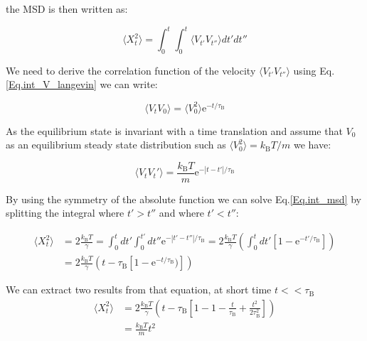 
the \gls{MSD} is then written as:

\begin{equation}
	\langle X_t ^ 2 \rangle  = \int _0 ^ {t} \int _0 ^{t} \langle V_{t'}V_{t''} \rangle dt'dt''
	\label{Eq.int_msd}
\end{equation}

We need to derive the correlation function of the velocity $ \langle V_{t'}V_{t''} \rangle $ using Eq.\ref{Eq.int_V_langevin} we can write:

\begin{equation}
	\langle V_t V_0 \rangle = \langle V_0 ^2 \rangle \mathrm{e}^{-t/\tau_{\mathrm{B}}}
\end{equation}

As the equilibrium state is invariant with a time translation and assume that $V_0$ as an equilibrium steady state distribution such as $\langle V_0^2 \rangle = k_\mathrm{B} T / m$ we have:

\begin{equation}
	\langle V_t V_t' \rangle = \frac{k_\mathrm{B}T}{m} \mathrm{e}^{-|t-t'|/\tau_{\mathrm{B}}}
\end{equation}

By using the symmetry of the absolute function we can solve Eq.\ref{Eq.int_msd} by splitting the integral where $t'>t''$ and where $ t' < t''$:

\begin{equation}
	\begin{aligned}
	\langle X_t ^2 \rangle & =   2 \frac{k_\mathrm{B}T}{\gamma} = \int _0 ^t dt' \int _0 ^{t'} dt'' \mathrm{e} ^ {- |t' - t''| / \tau_\mathrm{B}} = 2 \frac{k_\mathrm{B}T}{\gamma} \left( \int_0 ^t dt' \left[1 - \mathrm{e}^{-t'/\tau_\mathrm{B}} \right] \right) \\
	& = 2 \frac{k_\mathrm{B} T}{\gamma} \left( t - \tau_\mathrm{B} \left[ 1 - \mathrm{e}^{-t/\tau_\mathrm{B}}) \right] \right)
	\end{aligned}
\end{equation}

We can extract two results from that equation, at short time $t << \tau_\mathrm{B}$
\begin{equation}
	\begin{aligned}
	\langle X_t ^2 \rangle & =  2 \frac{k_\mathrm{B} T}{\gamma} \left( t - \tau_\mathrm{B} \left[ 1 - 1 - \frac{t}{\tau_\mathrm{B}} + \frac{t^2}{ 2 \tau_\mathrm{B} ^2}\right]         \right) \\
	& = \frac{k_\mathrm{B} T}{m} t^2
	\end{aligned}
\end{equation}

